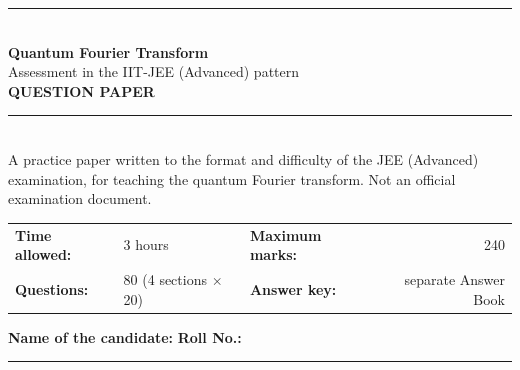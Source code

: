 \documentclass[11pt,a4paper]{article}
\begin{document}
\pagestyle{fancy}\fancyhf{}
\renewcommand{\headrulewidth}{0.4pt}

\thispagestyle{empty}
\begin{center}
{\color{brand}\rule{\linewidth}{1.2pt}}\\[6pt]
{\Huge\bfseries\color{brand} Quantum Fourier Transform}\\[4pt]
{\Large Assessment in the IIT-JEE (Advanced) pattern}\\[4pt]
{\large\bfseries QUESTION PAPER}\\[2pt]
{\color{brand}\rule{\linewidth}{1.2pt}}\\[1pt]
{\footnotesize\color{black!60} A practice paper written to the format and difficulty of the JEE (Advanced) examination, for
teaching the quantum Fourier transform. Not an official examination document.}
\end{center}
\vspace{-2pt}
\begin{tabularx}{\linewidth}{@{}lXlr@{}}
\textbf{Time allowed:} & 3 hours & \textbf{Maximum marks:} & 240\\
\textbf{Questions:} & 80 (4 sections $\times$ 20) & \textbf{Answer key:} & separate Answer Book
\end{tabularx}
\vspace{6pt}

\textbf{Name of the candidate:} \hrulefill\quad \textbf{Roll No.:} \rule{35mm}{0.4pt}
\end{document}
